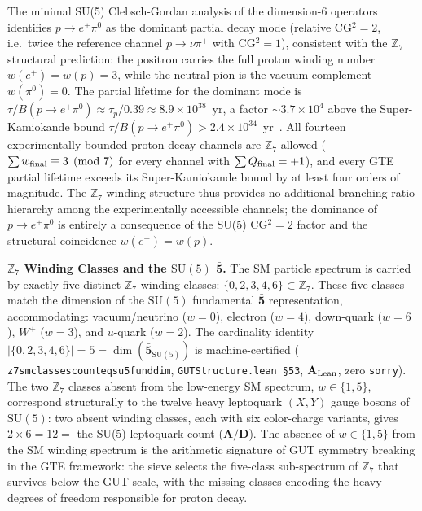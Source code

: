 \documentclass[11pt]{article}
\theoremstyle{remark}
\newcommand{\lean}[1]{%
  \penalty-100
  \begingroup\def\_{\textunderscore\allowbreak}\texttt{#1}\endgroup}
\newcommand{\CatAL}{\ensuremath{\textbf{A}_{\rm Lean}}}
\newcommand{\CatAD}{\textbf{A/D}}
\begin{document}
The minimal SU(5) Clebsch-Gordan analysis of the dimension-6 operators identifies $p \to e^+\pi^0$ as the dominant partial decay mode (relative CG$^2 = 2$, i.e.~twice the reference channel $p \to \bar\nu\pi^+$ with CG$^2=1$), consistent with the $\mathbb{Z}_7$ structural prediction: the positron carries the full proton winding number $w(e^+) = w(p) = 3$, while the neutral pion is the vacuum complement $w(\pi^0)=0$. The partial lifetime for the dominant mode is $\tau/B(p \to e^+\pi^0) \approx \tau_p / 0.39 \approx 8.9 \times 10^{38}$~yr, a factor $\sim 3.7 \times 10^4$ above the Super-Kamiokande bound $\tau/B(p \to e^+\pi^0) > 2.4 \times 10^{34}$~yr~\cite{ParticleDataGroup2022}. All fourteen experimentally bounded proton decay channels are $\mathbb{Z}_7$-allowed ($\sum w_{\rm final} \equiv 3 \pmod 7$ for every channel with $\sum Q_{\rm final} = +1$), and every GTE partial lifetime exceeds its Super-Kamiokande bound by at least four orders of magnitude. The $\mathbb{Z}_7$ winding structure thus provides no additional branching-ratio hierarchy among the experimentally accessible channels; the dominance of $p \to e^+\pi^0$ is entirely a consequence of the SU(5) CG$^2 = 2$ factor and the structural coincidence $w(e^+) = w(p)$.

\medskip

\noindent\textbf{$\mathbb{Z}_7$ Winding Classes and the $\mathrm{SU}(5)$ $\bar{\mathbf{5}}$.}\enspace
The SM particle spectrum is carried by exactly five distinct $\mathbb{Z}_7$ winding
classes: $\{0, 2, 3, 4, 6\} \subset \mathbb{Z}_7$.
These five classes match the dimension of the $\mathrm{SU}(5)$ fundamental
$\bar{\mathbf{5}}$ representation, accommodating: vacuum/neutrino ($w = 0$), electron
($w = 4$), down-quark ($w = 6$), $W^+$ ($w = 3$), and $u$-quark ($w = 2$).
The cardinality identity $|\{0,2,3,4,6\}| = 5 = \dim(\bar{\mathbf{5}}_{\mathrm{SU}(5)})$
is machine-certified (\lean{z7\_sm\_classes\_count\_eq\_su5\_fund\_dim},
\texttt{GUTStructure.lean~\S53}, $\CatAL$, zero \texttt{sorry}).
The two $\mathbb{Z}_7$ classes absent from the low-energy SM spectrum, $w \in \{1, 5\}$,
correspond structurally to the twelve heavy leptoquark $(X, Y)$ gauge bosons of
$\mathrm{SU}(5)$: two absent winding classes, each with six color-charge variants, gives
$2 \times 6 = 12 = $ the SU(5) leptoquark count ($\CatAD$).
The absence of $w \in \{1, 5\}$ from the SM winding spectrum is the arithmetic
signature of GUT symmetry breaking in the GTE framework: the sieve selects the
five-class sub-spectrum of $\mathbb{Z}_7$ that survives below the GUT scale, with the
missing classes encoding the heavy degrees of freedom responsible for proton decay.
\end{document}
